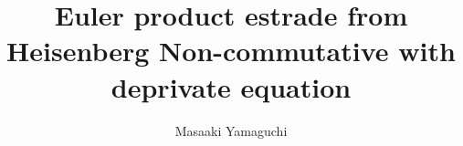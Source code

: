\documentclass{jsarticle}
\begin{document}
\title{Euler product estrade from \\
Heisenberg Non-commutative with \\
deprivate equation}
\author{Masaaki Yamaguchi}
\date{}
\maketitle

   \newcommand{\variint}{%
	\begin{picture}(15,30)
		\put(0,0){
			$ \iint $}
		\put(0,5){\line(15,0){15}}
	\end{picture} %
}
   \newcommand{\vare}{%
	\begin{picture}(5,5)
		\put(4,4){
			 \line(1,1){5} }
		\put(0,0){$\vee$}
	\end{picture} %
}
   \newcommand{\varve}{%
	\begin{picture}(5,5)
		\put(0,0){$\vee$}
		\put(0,5){\line(5,0){5}}
	\end{picture} %
}
\newcommand{\variiint}{%
	\begin{picture}(15,15)
		\put(0,0){
			$ \iiint $}
		\put(0,5){\line(15,0){20}}
	\end{picture} %
}



 \newcommand{\alearletter}{%
	 \begin{picture}(10,10)
		 \put(0,0){
			 $ \square $}
		 \put(0,0){\line(1,1){10}}
	 \end{picture} %
	 }

 \newcommand{\secproduct}{%
	 \begin{picture}(10,20)
		 \put(0,0){
			 $ \nabla $}
		 \put(5,0){+}
	 \end{picture} %
	 }
 \newcommand{\talot}{%
	 \begin{picture}(15,20)
		 \put(0,0){
			 $ \text{\scalebox{2.0}[2]{$\nabla$}}$}
		 \put(5,3){
			 $ \Delta $}
	 \end{picture} %
	 }
 \newcommand{\hazerdnabla}{%
	 \begin{picture}(15,20)
		 \put(0,0){
			 $ \text{\scalebox{2.0}[2]{$\nabla$}}$}
		 \put(5,3){
			 $\text{Y}  $}
	 \end{picture} %
	 }

 \newcommand{\securebox}{%
	 \begin{picture}(15,20)
		 \put(0,0){
			 $ \text{\scalebox{2.0}[2]{$\square$}}$}
		 \put(5,3){
			 $\text{Y}  $}
	 \end{picture} %
	 }


\newcommand{\timebow}{%
	\begin{picture}(5,5)
		\put(0,0){$\text{\rotatebox{90}{$\bowtie$}}$}
	\end{picture} %
	}
\end{document}
